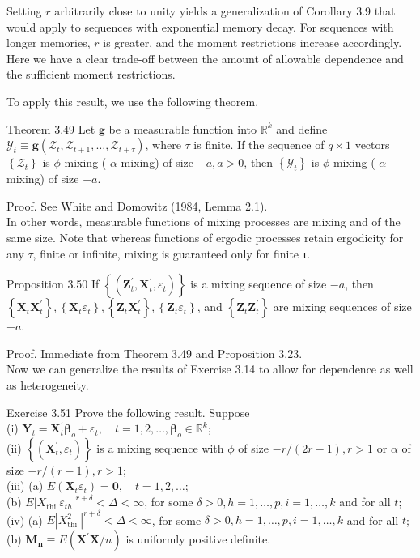\documentclass[10pt]{article}
\begin{document}
Setting $r$ arbitrarily close to unity yields a generalization of Corollary 3.9 that would apply to sequences with exponential memory decay. For sequences with longer memories, $r$ is greater, and the moment restrictions increase accordingly. Here we have a clear trade-off between the amount of allowable dependence and the sufficient moment restrictions.

To apply this result, we use the following theorem.

Theorem 3.49 Let $\mathbf{g}$ be a measurable function into $\mathbb{R}^{k}$ and define $\mathcal{Y}_{t} \equiv \mathbf{g}\left(\mathcal{Z}_{t}, \mathcal{Z}_{t+1}, \ldots, \mathcal{Z}_{t+\tau}\right)$, where $\tau$ is finite. If the sequence of $q \times 1$ vectors $\left\{\mathcal{Z}_{t}\right\}$ is $\phi$-mixing ( $\alpha$-mixing) of size $-a, a>0$, then $\left\{\mathcal{Y}_{t}\right\}$ is $\phi$-mixing ( $\alpha$-mixing) of size $-a$.

Proof. See White and Domowitz (1984, Lemma 2.1).\\
In other words, measurable functions of mixing processes are mixing and of the same size. Note that whereas functions of ergodic processes retain ergodicity for any $\tau$, finite or infinite, mixing is guaranteed only for finite τ.

Proposition 3.50 If $\left\{\left(\mathbf{Z}_{t}^{\prime}, \mathbf{X}_{t}^{\prime}, \varepsilon_{t}\right)\right\}$ is a mixing sequence of size $-a$, then $\left\{\mathbf{X}_{t} \mathbf{X}_{t}^{\prime}\right\},\left\{\mathbf{X}_{t} \varepsilon_{t}\right\},\left\{\mathbf{Z}_{t} \mathbf{X}_{t}^{\prime}\right\},\left\{\mathbf{Z}_{t} \varepsilon_{t}\right\}$, and $\left\{\mathbf{Z}_{t} \mathbf{Z}_{t}^{\prime}\right\}$ are mixing sequences of size $-a$.

Proof. Immediate from Theorem 3.49 and Proposition 3.23.\\
Now we can generalize the results of Exercise 3.14 to allow for dependence as well as heterogeneity.

Exercise 3.51 Prove the following result. Suppose\\
(i) $\mathbf{Y}_{t}=\mathbf{X}_{t}^{\prime} \boldsymbol{\beta}_{o}+\varepsilon_{t}, \quad t=1,2, \ldots, \boldsymbol{\beta}_{o} \in \mathbb{R}^{k}$;\\
(ii) $\left\{\left(\mathbf{X}_{t}^{\prime}, \varepsilon_{t}\right)\right\}$ is a mixing sequence with $\phi$ of size $-r /(2 r-1), r>1$ or $\alpha$ of size $-r /(r-1), r>1$;\\
(iii) (a) $E\left(\mathbf{X}_{t} \varepsilon_{t}\right)=\mathbf{0}, \quad t=1,2, \ldots$;\\
(b) $E\left|X_{\text {thi }} \varepsilon_{t h}\right|^{r+\delta}<\Delta<\infty$, for some $\delta>0, h=1, \ldots, p, i= 1, \ldots, k$ and for all $t$;\\
(iv) (a) $E\left|X_{\text {thi }}^{2}\right|^{r+\delta}<\Delta<\infty$, for some $\delta>0, h=1, \ldots, p, i=1, \ldots, k$ and for all $t$;\\
(b) $\mathbf{M}_{\boldsymbol{n}} \equiv E\left(\mathbf{X}^{\prime} \mathbf{X} / n\right)$ is uniformly positive definite.
\end{document}
